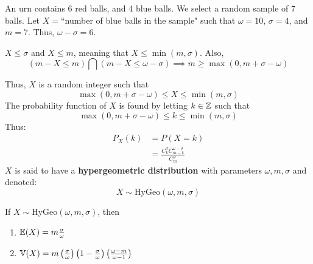 \documentclass{article}
\begin{document}
	\begin{exmp}
		An urn contains 6 red balls, and 4 blue balls. We select a random sample of 7 balls. Let $X = $``number of blue balls in the sample" such that $\omega=10$, $\sigma = 4$, and $m = 7$. Thus,  $\omega - \sigma = 6$.  
		\begin{note}
			$X \leq \sigma$ and $X \leq m$, meaning that $	X \leq \min(m, \sigma)$. Also, 
			$$ (m - X \leq m) \bigcap (m-X \leq \omega - \sigma ) \implies m \geq \max(0, m+\sigma - \omega)$$
		\end{note}
		Thus, $X$ is a random integer such that 
		$$ \max(0, m + \sigma - \omega) \leq X\leq \min (m, \sigma)$$
		The probability function of $X$ is found by letting $k \in \mathbb{Z}$ such that
		$$ \max(0, m + \sigma - \omega) \leq k\leq \min (m, \sigma)$$
		Thus:
		\begin{align*}
			P_X (k) &= P(X = k) \\
			&= \frac{C_k^\sigma C_{m-k}^{\omega - \sigma}}{C_m^\omega}
		\end{align*}
		$X$ is said to have a \textbf{hypergeometric distribution} with parameters $\omega, m, \sigma$ and denoted:
		$$ X \sim \text{HyGeo}(\omega, m, \sigma)$$
	\end{exmp}
	\begin{prop}
		If $X \sim $HyGeo$(\omega, m, \sigma)$, then
		\begin{enumerate}
			\item $\mathbb{E}(X) = m \frac{\sigma}{\omega}$ 
			\item $\mathbb{V}(X) = m \left( \frac{\sigma}{\omega}\right) \left(1- \frac{\sigma}{\omega}\right)\big( \frac{\omega-m}{\omega-1} \big) $
		\end{enumerate}
	\end{prop}
\end{document}
